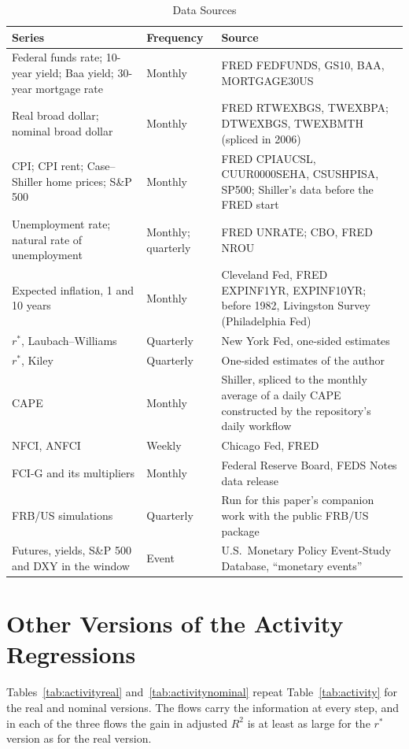 \documentclass[11pt]{article}
\newcommand{\rs}{r^{*}}
\begin{document}
\begin{appendices}
\begin{table}[tp]\centering\small
\caption{Data Sources}\label{tab:data}
\begin{tabular}{p{}p{}p{}}\toprule
Series & Frequency & Source \\\midrule
Federal funds rate; 10-year yield; Baa yield; 30-year mortgage rate & Monthly & FRED FEDFUNDS, GS10, BAA, MORTGAGE30US \\
Real broad dollar; nominal broad dollar & Monthly & FRED RTWEXBGS, TWEXBPA; DTWEXBGS, TWEXBMTH (spliced in 2006) \\
CPI; CPI rent; Case--Shiller home prices; S\&P 500 & Monthly & FRED CPIAUCSL, CUUR0000SEHA, CSUSHPISA, SP500; Shiller's data before the FRED start \\
Unemployment rate; natural rate of unemployment & Monthly; quarterly & FRED UNRATE; CBO, FRED NROU \\
Expected inflation, 1 and 10 years & Monthly & Cleveland Fed, FRED EXPINF1YR, EXPINF10YR; before 1982, Livingston Survey (Philadelphia Fed) \\
$\rs$, Laubach--Williams & Quarterly & New York Fed, one-sided estimates \\
$\rs$, Kiley & Quarterly & One-sided estimates of the author \\
CAPE & Monthly & Shiller, spliced to the monthly average of a daily CAPE constructed by the repository's daily workflow \\
NFCI, ANFCI & Weekly & Chicago Fed, FRED \\
FCI-G and its multipliers & Monthly & Federal Reserve Board, FEDS Notes data release \\
FRB/US simulations & Quarterly & Run for this paper's companion work with the public FRB/US package \\
Futures, yields, S\&P 500 and DXY in the window & Event & U.S.\ Monetary Policy Event-Study Database, ``monetary events'' \citep{acosta2025} \\
\bottomrule
\end{tabular}
\end{table}






\section{Other Versions of the Activity Regressions}\label{app:activity}
Tables~\ref{tab:activityreal} and~\ref{tab:activitynominal} repeat Table~\ref{tab:activity} for the real and nominal versions. The flows carry the information at every step, and in each of the three flows the gain in adjusted $R^2$ is at least as large for the $\rs$ version as for the real version.


\end{appendices}
\end{document}
